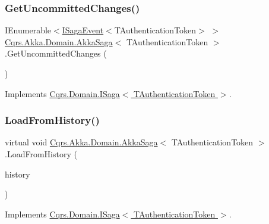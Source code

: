 \subsubsection{\texorpdfstring{Get\+Uncommitted\+Changes()}{GetUncommittedChanges()}}
{\footnotesize\ttfamily I\+Enumerable$<$\hyperlink{interfaceCqrs_1_1Events_1_1ISagaEvent}{I\+Saga\+Event}$<$T\+Authentication\+Token$>$ $>$ \hyperlink{classCqrs_1_1Akka_1_1Domain_1_1AkkaSaga}{Cqrs.\+Akka.\+Domain.\+Akka\+Saga}$<$ T\+Authentication\+Token $>$.Get\+Uncommitted\+Changes (\begin{DoxyParamCaption}{ }\end{DoxyParamCaption})}



Implements \hyperlink{interfaceCqrs_1_1Domain_1_1ISaga_abb77811b4f7d19adb61f9d33da18e7e0}{Cqrs.\+Domain.\+I\+Saga$<$ T\+Authentication\+Token $>$}.

\mbox{\label{classCqrs_1_1Akka_1_1Domain_1_1AkkaSaga_a40b859bc15c2f7c87a21b07f9bc9548c}} 
\subsubsection{\texorpdfstring{Load\+From\+History()}{LoadFromHistory()}}
{\footnotesize\ttfamily virtual void \hyperlink{classCqrs_1_1Akka_1_1Domain_1_1AkkaSaga}{Cqrs.\+Akka.\+Domain.\+Akka\+Saga}$<$ T\+Authentication\+Token $>$.Load\+From\+History (\begin{DoxyParamCaption}\item[{I\+Enumerable$<$ \hyperlink{interfaceCqrs_1_1Events_1_1ISagaEvent}{I\+Saga\+Event}$<$ T\+Authentication\+Token $>$$>$}]{history }\end{DoxyParamCaption})\hspace{0.3cm}{\ttfamily [virtual]}}



Implements \hyperlink{interfaceCqrs_1_1Domain_1_1ISaga_a2714804684bc65cf4dec79b4697b9b21}{Cqrs.\+Domain.\+I\+Saga$<$ T\+Authentication\+Token $>$}.

\mbox{\label{classCqrs_1_1Akka_1_1Domain_1_1AkkaSaga_a83269fac4653cca097461e924feaea7f}} 
